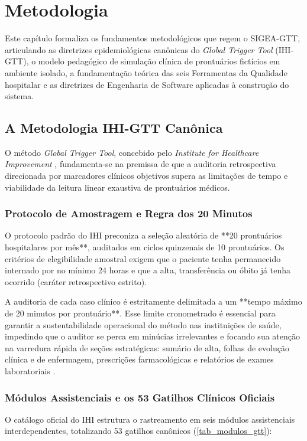 \chapter{Metodologia}
\label{cap_metodologia}

Este capítulo formaliza os fundamentos metodológicos que regem o SIGEA-GTT, articulando as diretrizes epidemiológicas canônicas do \textit{Global Trigger Tool} (IHI-GTT), o modelo pedagógico de simulação clínica de prontuários fictícios em ambiente isolado, a fundamentação teórica das seis Ferramentas da Qualidade hospitalar e as diretrizes de Engenharia de Software aplicadas à construção do sistema.

\section{A Metodologia IHI-GTT Canônica}
\label{sec_ihi_gtt_metodologia}

O método \textit{Global Trigger Tool}, concebido pelo \textit{Institute for Healthcare Improvement} \cite{griffin2009ihi}, fundamenta-se na premissa de que a auditoria retrospectiva direcionada por marcadores clínicos objetivos supera as limitações de tempo e viabilidade da leitura linear exaustiva de prontuários médicos.

\subsection{Protocolo de Amostragem e Regra dos 20 Minutos}
O protocolo padrão do IHI preconiza a seleção aleatória de **20 prontuários hospitalares por mês**, auditados em ciclos quinzenais de 10 prontuários. Os critérios de elegibilidade amostral exigem que o paciente tenha permanecido internado por no mínimo 24 horas e que a alta, transferência ou óbito já tenha ocorrido (caráter retrospectivo estrito).

A auditoria de cada caso clínico é estritamente delimitada a um **tempo máximo de 20 minutos por prontuário**. Esse limite cronometrado é essencial para garantir a sustentabilidade operacional do método nas instituições de saúde, impedindo que o auditor se perca em minúcias irrelevantes e focando sua atenção na varredura rápida de seções estratégicas: sumário de alta, folhas de evolução clínica e de enfermagem, prescrições farmacológicas e relatórios de exames laboratoriais \cite{resende2019gtt}.

\subsection{Módulos Assistenciais e os 53 Gatilhos Clínicos Oficiais}
O catálogo oficial do IHI estrutura o rastreamento em seis módulos assistenciais interdependentes, totalizando 53 gatilhos canônicos (\autoref{tab_modulos_gtt}):

